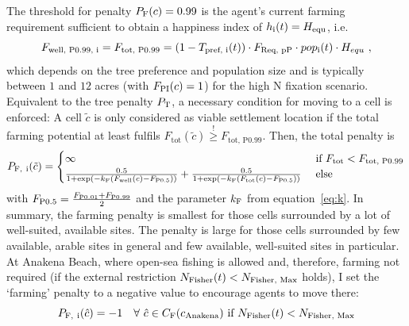 The threshold for penalty $P_{\rm F}(c)=0.99$ is the agent's current farming requirement sufficient to obtain a happiness index of $h_{\rm i}(t) = H_{\rm equ}$, i.e.\
\begin{equation} 
F_\text{well, P0.99, i} = F_\text{tot, P0.99} = (1-T_\text{pref, i}(t))\cdot F_\text{Req, pP}\cdot pop_{\rm i}(t) \cdot H_{equ} \ , 
\end{equation}
which depends on the tree preference and population size and is typically between $1$ and $12$ acres (with $F_{\rm PI}(c)=1$) for the high N fixation scenario.
Equivalent to the tree penalty $P_{\rm T}$, a necessary condition for moving to a cell is enforced:
 A cell $\tilde{c}$ is only considered as viable settlement location if the total farming potential at least fulfils
 $F_\text{tot}(\tilde{c})  \stackrel{!}{\geq} F_\text{tot, P0.99}$.
Then, the total penalty is 
\begin{equation}
P_{\rm F, \ i} (\tilde{c}) = 
\begin{cases} 
\infty & \text{ if } F_\text{tot} < F_\text{tot, P0.99}\\
\frac{0.5}{1+\exp\left( - k_{\rm F} (F_\text{well}(c)-F_\text{P0.5}) \right)} + \frac{0.5}{1+\exp\left( - k_{\rm F} (F_\text{tot}(c)-F_\text{P0.5}) \right)} & \text{ else}
\end{cases}
\end{equation}
with $F_\text{P0.5} = \frac{F_{\rm P0.01}+F_{\rm P0.99}}{2}$ and the parameter $k_{\rm F}$ from equation~\ref{eq:k}.
In summary, the farming penalty is smallest for those cells surrounded by a lot of well-suited, available sites.
The penalty is large for those cells surrounded by few available, arable sites in general and few available, well-suited sites in particular.
At Anakena Beach, where open-sea fishing is allowed and, therefore, farming not required (if the external restriction $N_{\rm Fisher}(t)<N_\text{Fisher, Max}$ holds), I set the `farming' penalty to a negative value to encourage agents to move there:
\begin{equation}
	P_{\rm F, \ i}(\hat{c}) = - 1 %
	 \quad \forall \  \hat{c} \in C_\text{F}(c_{\rm Anakena}) \text{ if }N_{\rm Fisher}(t)<N_\text{Fisher, Max}
\end{equation}


